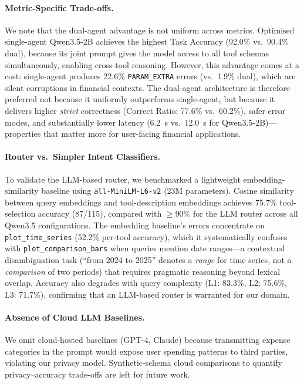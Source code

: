\documentclass[11pt,twocolumn]{article}
\begin{document}
\paragraph{Metric-Specific Trade-offs.}
We note that the dual-agent advantage is not uniform across metrics.
Optimised single-agent Qwen3.5-2B achieves the highest Task Accuracy
(92.0\% vs.\ 90.4\% dual), because its joint prompt gives the model
access to all tool schemas simultaneously, enabling cross-tool
reasoning.
However, this advantage comes at a cost: single-agent produces
22.6\% \texttt{PARAM\_EXTRA} errors (vs.\ 1.9\% dual), which are
silent corruptions in financial contexts.
The dual-agent architecture is therefore preferred not because it
uniformly outperforms single-agent, but because it delivers
higher \emph{strict} correctness (Correct Ratio: 77.6\% vs.\ 60.2\%),
safer error modes, and substantially lower latency (6.2~s vs.\ 12.0~s
for Qwen3.5-2B)---properties that matter more for user-facing
financial applications.

\paragraph{Router vs.\ Simpler Intent Classifiers.}
To validate the LLM-based router, we benchmarked a lightweight
embedding-similarity baseline using
\texttt{all-MiniLM-L6-v2} (23M parameters).
Cosine similarity between query embeddings and tool-description
embeddings achieves 75.7\% tool-selection accuracy (87/115),
compared with $\geq$90\% for the LLM router across all Qwen3.5
configurations.
The embedding baseline's errors concentrate on
\texttt{plot\_time\_series} (52.2\% per-tool accuracy),
which it systematically confuses with
\texttt{plot\_comparison\_bars} when queries mention date ranges---a
contextual disambiguation task (``from 2024 to 2025'' denotes a
\emph{range} for time series, not a \emph{comparison} of two
periods) that requires pragmatic reasoning beyond lexical overlap.
Accuracy also degrades with query complexity (L1: 83.3\%,
L2: 75.6\%, L3: 71.7\%), confirming that an LLM-based router is
warranted for our domain.

\paragraph{Absence of Cloud LLM Baselines.}
We omit cloud-hosted baselines (GPT-4, Claude) because transmitting expense categories in the prompt would expose user spending patterns to third parties, violating our privacy model. Synthetic-schema cloud comparisons to quantify privacy--accuracy trade-offs are left for future work.
\end{document}

